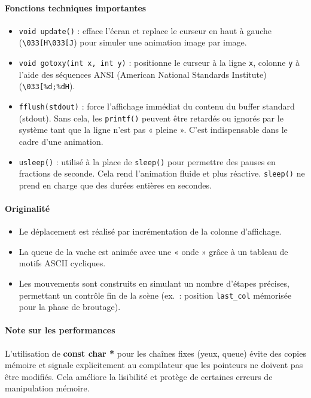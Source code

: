 \documentclass[a4paper,french,11pt]{article}
\begin{document}
\paragraph{Fonctions techniques importantes}
\begin{itemize}
\item \texttt{void update()} : efface l’écran et replace le curseur en haut à gauche (\verb|\033[H\033[J|) pour simuler une animation image par image.
\item \texttt{void gotoxy(int x, int y)} : positionne le curseur à la ligne \texttt{x}, colonne \texttt{y} à l’aide des séquences ANSI (American National Standards Institute) (\verb|\033[%d;%dH|).
\item \texttt{fflush(stdout)} : force l’affichage immédiat du contenu du buffer standard (stdout). Sans cela, les \texttt{printf()} peuvent être retardés ou ignorés par le système tant que la ligne n’est pas « pleine ». C’est indispensable dans le cadre d’une animation.
\item \texttt{usleep()} : utilisé à la place de \texttt{sleep()} pour permettre des pauses en fractions de seconde. Cela rend l’animation fluide et plus réactive. \texttt{sleep()} ne prend en charge que des durées entières en secondes.
\end{itemize}

\paragraph{Originalité}

\begin{itemize}
\item Le déplacement est réalisé par incrémentation de la colonne d’affichage.
\item La queue de la vache est animée avec une « onde » grâce à un tableau de motifs ASCII cycliques.
\item Les mouvements sont construits en simulant un nombre d’étapes précises, permettant un contrôle fin de la scène (ex. : position \texttt{last\_col} mémorisée pour la phase de broutage).
\end{itemize}

\paragraph{Note sur les performances}

L’utilisation de \textbf{const char *} pour les chaînes fixes (yeux, queue) évite des copies mémoire et signale explicitement au compilateur que les pointeurs ne doivent pas être modifiés. Cela améliore la lisibilité et protège de certaines erreurs de manipulation mémoire.
\end{document}

